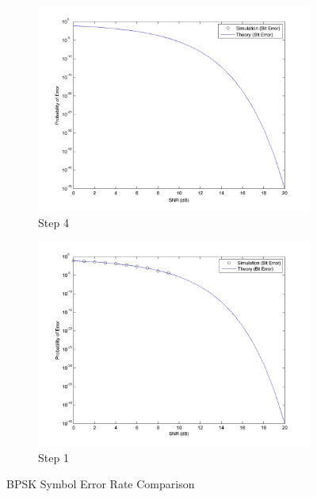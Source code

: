 \documentclass[]{article}
\begin{document}
\begin{figure}[h]
        \centering
        \begin{subfigure}[b]{0.4\textwidth}
                \includegraphics[width=\textwidth]{bpSNR.jpg}
                \caption{Step 4}
                \label{fig:bpSNR}
        \end{subfigure}%
        \qquad \quad %
        \begin{subfigure}[b]{0.4\textwidth}
                \includegraphics[width=\textwidth]{bpSNRstep1.jpg}
                \caption{Step 1}
                \label{fig:bpSNR1}
        \end{subfigure}
        \caption{BPSK Symbol Error Rate Comparison \label{fig:bpsk}}
\end{figure}
\end{document}
